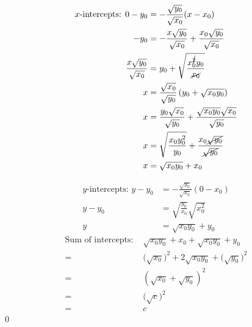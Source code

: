 \documentclass{article}
\begin{document}
\begin{minipage}[t]{0.42\linewidth}
\begin{align*}
	\text{$x$-intercepts: }0-y_0&=-\frac{\sqrt{y_0}}{\sqrt{x_0}}(x-x_0) \\
	-y_0&=-\frac{x\sqrt{y_0}}{\sqrt{x_0}}+\frac{x_0\sqrt{y_0}}{\sqrt{x_0}} \\
	\frac{x\sqrt{y_0}}{\sqrt{x_0}}&=y_0+\sqrt{\frac{x_0^{\cancel{2}}y_0}{\cancel{x_0}}} \\
	x&=\frac{\sqrt{x_0}}{\sqrt{y_0}}\left(y_0+\sqrt{x_0y_0}\right) \\
	x&=\frac{y_0\sqrt{x_0}}{\sqrt{y_0}}+\frac{\sqrt{x_0y_0}\sqrt{x_0}}{\sqrt{y_0}} \\
	x&=\sqrt{\frac{x_0y_0^2}{y_0}}+\frac{x_0\cancel{\sqrt{y_0}}}{\cancel{\sqrt{y_0}}} \\
	x&=\sqrt{x_0y_0}+x_0
\end{align*}
\end{minipage}
\begin{minipage}[t]{0.55\linewidth}
\begin{align*}
	\text{$y$-intercepts: }y-y_0&=-\frac{\sqrt{y_0}}{\sqrt{x_0}}(0-x_0) \\
	y-y_0&=\sqrt{\frac{y_0}{x_0}}\sqrt{x_0^2} \\
	y&=\sqrt{x_0y_0}+y_0
\end{align*}
\begin{align*}
	\text{Sum of intercepts: }&\sqrt{x_0y_0}+x_0+\sqrt{x_0y_0}+y_0 \\
	=\,&\bigl(\sqrt{x_0}\bigr)^2+2\sqrt{x_0y_0}+\bigl(\sqrt{y_0}\bigr)^2 \\
	=\,&\left(\sqrt{x_0}+\sqrt{y_0}\right)^2 \\
	=\,&\bigl(\sqrt{c}\bigr)^2 \\
	=\,&c
\end{align*}
\qed
\end{minipage}
\end{document}
